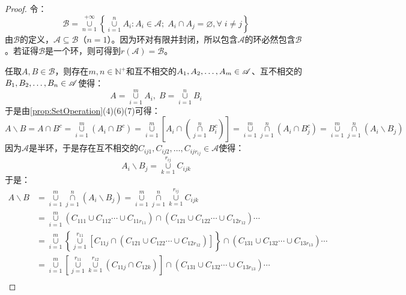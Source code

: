 \begin{proof}
	令：
	\begin{equation*}
		\mathscr{B}=\underset{n=1}{\overset{+\infty}{\cup}}
		\left\{\underset{i=1}{\overset{n}{\cup}}A_i:A_i\in\mathscr{A};\;A_i\cap A_j=\varnothing,\forall\;i\ne j\right\}
	\end{equation*}
	由$\mathscr{B}$的定义，$\mathscr{A}\subseteq \mathscr{B}$（$n=1$）。因为环对有限并封闭，所以包含$\mathscr{A}$的环必然包含$\mathscr{B}$。若证得$\mathscr{B}$是一个环，则可得到$r(\mathscr{A})=\mathscr{B}$。\par
	任取$A,B\in \mathscr{B}$，则存在$m,n\in\mathbb{N}^+$和互不相交的$A_1, A_2, \dots, A_{m}\in \mathscr{A}$、互不相交的$B_1, B_2, \dots, B_{n}\in \mathscr{A}$使得：
	\begin{equation*}
		A=\underset{i=1}{\overset{m}{\cup}}A_i,\;
		B=\underset{i=1}{\overset{n}{\cup}}B_i
	\end{equation*}
	于是由\cref{prop:SetOperation}(4)(6)(7)可得：
	\begin{equation*}
		A\backslash B=A\cap B^c=\underset{i=1}{\overset{m}{\cup}}(A_i\cap B^c)=\underset{i=1}{\overset{m}{\cup}}\left[A_i\cap\left(\underset{j=1}{\overset{n}{\cap}}B_i^c\right)\right]=\underset{i=1}{\overset{m}{\cup}}\underset{j=1}{\overset{n}{\cap}}(A_i\cap B_j^c)=\underset{i=1}{\overset{m}{\cup}}\underset{j=1}{\overset{n}{\cap}}(A_i\backslash B_j)
	\end{equation*}
	因为$\mathscr{A}$是半环，于是存在互不相交的$C_{ij1},C_{ij2},\dots,C_{ijr_{ij}}\in \mathscr{A}$使得：
	\begin{equation*}
		A_i\backslash B_j=\underset{k=1}{\overset{r_{ij}}{\cup}}C_{ijk}
	\end{equation*}
	于是：
	\begin{align*}
		A\backslash B&=\underset{i=1}{\overset{m}{\cup}}\underset{j=1}{\overset{n}{\cap}}(A_i\backslash B_j)=\underset{i=1}{\overset{m}{\cup}}\underset{j=1}{\overset{n}{\cap}}\underset{k=1}{\overset{r_{ij}}{\cup}}C_{ijk} \\
		&=\underset{i=1}{\overset{m}{\cup}}(C_{111}\cup C_{112}\cdots\cup C_{11r_{11}})\cap(C_{121}\cup C_{122}\cdots\cup C_{12r_{12}})\cdots \\
		&=\underset{i=1}{\overset{m}{\cup}}\left\{\underset{j=1}{\overset{r_{11}}{\cup}}[C_{11j}\cap(C_{121}\cup C_{122}\cdots\cup C_{12r_{12}})]\right\}\cap(C_{131}\cup C_{132}\cdots\cup C_{13r_{13}})\cdots \\
		&=\underset{i=1}{\overset{m}{\cup}}\left[\underset{j=1}{\overset{r_{11}}{\cup}}\underset{k=1}{\overset{r_{12}}{\cup}}(C_{11j}\cap C_{12k})\right]\cap(C_{131}\cup C_{132}\cdots\cup C_{13r_{13}})\cdots \\

\end{align*}
\end{proof}
